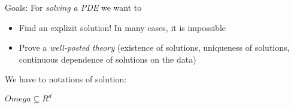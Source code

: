 \documentclass[ngerman, BCOR=5mm]{scrreprt}
\theoremstyle{tommy}
\begin{document}

Goals: For \emph{solving a PDE} we want to
\begin{itemize}
  \item Find an explizit solution! In many cases, it is impossible
  \item Prove a \emph{well-posted theory} (existence of solutions, uniqueness of solutions, continuous dependence of solutions on the data)
\end{itemize}

We have to notations of solution:

\(Omega \subseteq R^d\)
\end{document}
